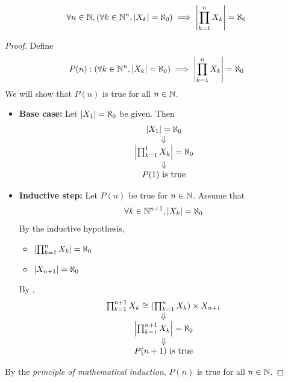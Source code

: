 \bigskip

\begin{theorem} \label{an:thm:product-of-finite-countable-sets-is-countable}
    \[
    \forall n \in \N, \paren*{\forall k \in \N^{n}, \abs*{X_{k}} = \aleph_{0}}
    \implies \abs*{\prod_{k = 1}^{n} X_{k}} = \aleph_{0}
    \]
\end{theorem}

\begin{proof}
    Define
    \[
    P(n): \paren*{\forall k \in \N^{n}, \abs*{X_{k}} = \aleph_{0}} \implies \abs*{\prod_{k = 1}^{n} X_{k}} = \aleph_{0}
    \]
    We will show that $P(n)$ is true for all $n \in \N$.
    \begin{itemize}
        \item \textbf{Base case:} Let $\abs*{X_{1}} = \aleph_{0}$ be given. Then
        \[
        \begin{array}{c}
            \abs*{X_{1}} = \aleph_{0} \\
            \Downarrow \\
            \abs*{\prod_{k = 1}^{1} X_{k}} = \aleph_{0} \\
            \Downarrow \\
            P(1) \text{ is true}
        \end{array}
        \]
        \item \textbf{Inductive step:} Let $P(n)$ be true for $n \in \N$. Assume that
        \[
        \forall k \in \N^{n + 1}, \abs*{X_{k}} = \aleph_{0}
        \]
        By the inductive hypothesis,
        \begin{itemize}
            \item $\abs*{\prod_{k = 1}^{n} X_{k}} = \aleph_{0}$
            \item $\abs*{X_{n + 1}} = \aleph_{0}$
        \end{itemize}
        By ,
        \[
        \begin{array}{c}
            \prod_{k = 1}^{n + 1} X_{k} \cong \paren*{\prod_{k = 1}^{n} X_{k}} \times X_{n + 1} \\
            \Downarrow \\
            \abs*{\prod_{k = 1}^{n + 1} X_{k}} = \aleph_{0} \\
            \Downarrow \\
            P(n + 1) \text{ is true}
        \end{array}
        \]
    \end{itemize}
    By the \emph{principle of mathematical induction}, $P(n)$ is true for all $n \in \N$.
\end{proof}

